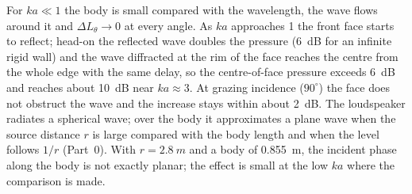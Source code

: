 \documentclass[a4paper,10pt]{article}
\begin{document}
For $ka\ll1$ the body is small compared with the wavelength, the wave flows around it
and $\Delta L_\theta\to0$ at every angle. As $ka$ approaches 1 the front face starts to
reflect; head-on the reflected wave doubles the pressure (\SI{+6}{dB} for an infinite
rigid wall) and the wave diffracted at the rim of the face reaches the centre from the
whole edge with the same delay, so the centre-of-face pressure exceeds \SI{+6}{dB} and
reaches about \SI{+10}{dB} near $ka\approx3$. At grazing incidence ($90^\circ$) the face
does not obstruct the wave and the increase stays within about \SI{2}{dB}. The
loudspeaker radiates a spherical wave; over the body it approximates a plane wave when
the source distance $r$ is large compared with the body length and when the level
follows $1/r$ (Part~0). With $r=\SI{2.8}{m}$ and a body of \SI{0.855}{m}, the incident
phase along the body is not exactly planar; the effect is small at the low $ka$ where
the comparison is made.
\end{document}
